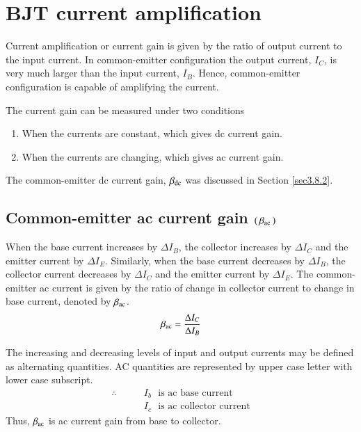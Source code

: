 \section{BJT current amplification}\label{sec3.14}

Current amplification or current gain is given by the ratio of output current to the input current. In common-emitter configuration the output current, $I_{C}$, is very much larger than the input current, $I_{B}$. Hence, common-emitter configuration is capable of amplifying the current.

The current gain can be measured under two conditions
\begin{enumerate}
\itemsep=0pt
\item When the currents are constant, which gives dc current gain.

\item When the currents are changing, which gives ac current gain.
\end{enumerate}

The common-emitter dc current gain, $\beta_{\operatorname{dc}}$ was discussed in Section \ref{sec3.8.2}.

\subsection[Common-emitter ac current gain $(\,\beta_{\ac}\,)$]{Common-emitter ac current gain \boldmath$(\,\beta_{\ac}\,)$}\label{sec3.14.1}

When the base current increases by $\Delta I_{B}$, the collector increases by $\Delta I_{C}$ and the emitter current by $\Delta I_{E}$. Similarly, when the base current decreases by $\Delta I_{B}$, the collector current decreases by $\Delta I_{C}$ and the emitter current by $\Delta I_{E}$. The common-emitter ac current is given by the ratio of change in collector current to change in base current, denoted by $\beta_{\operatorname{ac}}$.
\begin{equation}
\beta_{\operatorname{ac}}=\dfrac{\Delta I_{C}}{\Delta I_{B}}\label{eq3.12}
\end{equation}

The increasing and decreasing levels of input and output currents may be defined as alternating quantities. AC quantities are represented by upper case letter with lower case subscript.
\begin{align*}
\therefore\qquad & I_{b}\text{~ is ac base current}\\
                 & I_{c} \text{~ is ac collector current}
\end{align*}
Thus, $\beta_{\operatorname{ac}}$ is ac current gain from base to collector.

